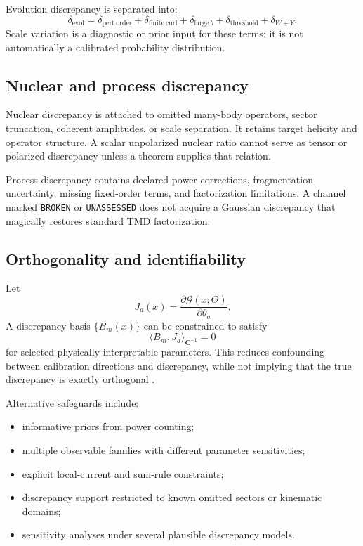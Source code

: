 \documentclass[11pt]{article}
\newcommand{\cG}{\mathcal G}
\newcommand{\evol}{\mathrm{evol}}
\begin{document}
Evolution discrepancy is separated into:
\begin{equation}
 \delta_{\evol}
 =
 \delta_{\mathrm{pert\ order}}
 +
 \delta_{\mathrm{finite\ curl}}
 +
 \delta_{\mathrm{large}\ b}
 +
 \delta_{\mathrm{threshold}}
 +
 \delta_{W+Y}.
 \label{eq:evolution-discrepancy}
\end{equation}
Scale variation is a diagnostic or prior input for these terms; it is not
automatically a calibrated probability distribution.

\subsection{Nuclear and process discrepancy}

Nuclear discrepancy is attached to omitted many-body operators, sector
truncation, coherent amplitudes, or scale separation.  It retains target
helicity and operator structure.  A scalar unpolarized nuclear ratio cannot
serve as tensor or polarized discrepancy unless a theorem supplies that
relation.

Process discrepancy contains declared power corrections, fragmentation
uncertainty, missing fixed-order terms, and factorization limitations.
A channel marked \texttt{BROKEN} or \texttt{UNASSESSED} does not acquire a
Gaussian discrepancy that magically restores standard TMD factorization.

\subsection{Orthogonality and identifiability}

Let
\begin{equation}
 J_a(x)=\frac{\partial\cG(x;\Theta)}{\partial\theta_a}.
 \label{eq:model-tangent}
\end{equation}
A discrepancy basis \(\{B_m(x)\}\) can be constrained to satisfy
\begin{equation}
 \langle B_m,J_a\rangle_{\bm C^{-1}}=0
 \label{eq:orthogonal-discrepancy}
\end{equation}
for selected physically interpretable parameters.  This reduces confounding
between calibration directions and discrepancy, while not implying that the
true discrepancy is exactly orthogonal
\cite{Plumlee2017}.

Alternative safeguards include:
\begin{itemize}
\item informative priors from power counting;
\item multiple observable families with different parameter sensitivities;
\item explicit local-current and sum-rule constraints;
\item discrepancy support restricted to known omitted sectors or kinematic
      domains;
\item sensitivity analyses under several plausible discrepancy models.
\end{itemize}
\end{document}
